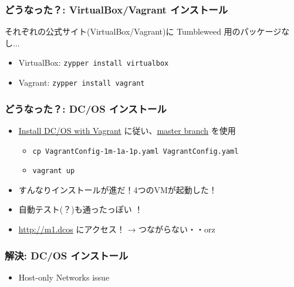 \documentclass[aspectratio=169,11pt,hyperref={colorlinks=true}]{beamer}
\begin{document}
\begin{frame}
  \frametitle{どうなった？: VirtualBox/Vagrant インストール}
  それぞれの公式サイト(VirtualBox/Vagrant)に Tumbleweed 用のパッケージなし...
  \begin{itemize}
    \item VirtualBox: \lstinline[basicstyle=\ttfamily\footnotesize,columns=fixed]{zypper install virtualbox}
    \item Vagrant: \lstinline[basicstyle=\ttfamily\footnotesize,columns=fixed]{zypper install vagrant}
  \end{itemize}
\end{frame}

\begin{frame}
  \frametitle{どうなった？: DC/OS インストール}
  \begin{itemize}
    \item \href{https://dcos.io/docs/1.9/installing/local/}{Install DC/OS with Vagrant} に従い、\href{https://github.com/dcos/dcos-vagrant/}{master branch} を使用
    \begin{itemize}
      \item \lstinline[basicstyle=\ttfamily\footnotesize,columns=fixed]{cp VagrantConfig-1m-1a-1p.yaml VagrantConfig.yaml}
      \item \lstinline[basicstyle=\ttfamily\footnotesize,columns=fixed]{vagrant up}
    \end{itemize}
    \item すんなりインストールが進だ！4つのVMが起動した！
    \item 自動テスト(？)も通ったっぽい ！
    \item \url{http://m1.dcos} にアクセス！ → つながらない・・orz
  \end{itemize}
\end{frame}

\begin{frame}
  \frametitle{解決: DC/OS インストール}
  \begin{itemize}
    \item Host-only Networks issue
      
  \end{itemize}
\end{frame}
\end{document}
